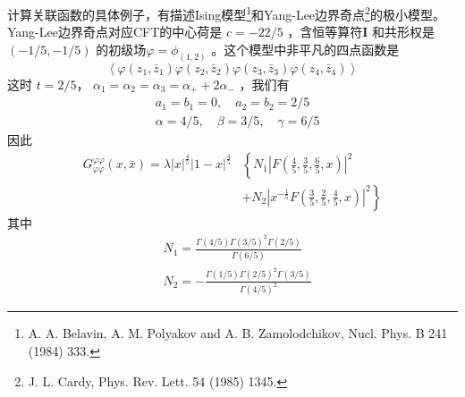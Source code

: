 计算关联函数的具体例子，有描述Ising模型\footnote{A. A. Belavin, A. M. Polyakov and A. B. Zamolodchikov, Nucl. Phys. B 241 (1984) 333.}和Yang-Lee边界奇点\footnote{J. L. Cardy, Phys. Rev. Lett. 54 (1985) 1345.}的极小模型。Yang-Lee边界奇点对应CFT的中心荷是 $c=-22/5$ ，含恒等算符$ \boldsymbol{I}$ 和共形权是$ (-1/5,-1/5)$ 的初级场$ \varphi=\phi_{(1,2)}$ 。这个模型中非平凡的四点函数是
$$
\left\langle\varphi\left(z_{1}, \bar{z}_{1}\right) \varphi\left(z_{2}, \bar{z}_{2}\right) \varphi\left(z_{3}, \bar{z}_{3}\right) \varphi\left(z_{4}, \bar{z}_{4}\right)\right\rangle
$$
这时 $t=2/5 $， $\alpha_{1}=\alpha_{2}=\alpha_{3}=\alpha_{+}+2 \alpha_{-}$ ，我们有
\begin{align} &a_1=b_1=0,\quad a_2=b_2=2/5\\ &\alpha=4/5,\quad \beta=3/5,\quad \gamma=6/5 \end{align}
因此
\begin{equation}
	\begin{aligned} G_{\varphi \varphi}^{\varphi \varphi}(x, \bar{x})=\lambda|x|^{\frac{4}{5}}|1-x|^{\frac{4}{5}} &\left\{N_{1}\left|F\left(\frac{4}{5}, \frac{3}{5}, \frac{6}{5}, x\right)\right|^{2}\right.\\&\left.+N_{2}\left|x^{-\frac{1}{5}} F\left(\frac{3}{5}, \frac{2}{5}, \frac{4}{5}, x\right)\right|^{2}\right\} \end{aligned} 
\end{equation}
其中
\begin{align} &N_{1}=\frac{\Gamma\left(4/5\right) \Gamma\left(3/5\right)^{2} \Gamma\left(2/5\right)}{\Gamma\left(6/5\right)} \\ &N_{2}=-\frac{\Gamma\left(1/5\right) \Gamma\left(2/5\right)^{2} \Gamma\left(3/5\right)}{\Gamma\left(4/5\right)^{2}} \end{align}


